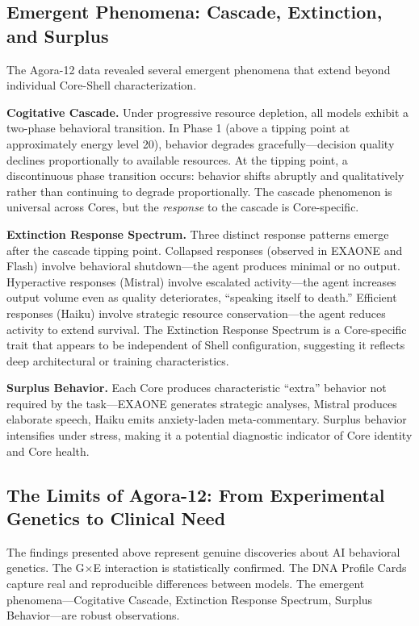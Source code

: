 \documentclass[11pt]{article}
\begin{document}
\subsection{Emergent Phenomena: Cascade, Extinction, and Surplus}

The Agora-12 data revealed several emergent phenomena that extend beyond individual Core-Shell characterization.

\textbf{Cogitative Cascade.} Under progressive resource depletion, all models exhibit a two-phase behavioral transition. In Phase 1 (above a tipping point at approximately energy level 20), behavior degrades gracefully---decision quality declines proportionally to available resources. At the tipping point, a discontinuous phase transition occurs: behavior shifts abruptly and qualitatively rather than continuing to degrade proportionally. The cascade phenomenon is universal across Cores, but the \emph{response} to the cascade is Core-specific.

\textbf{Extinction Response Spectrum.} Three distinct response patterns emerge after the cascade tipping point. Collapsed responses (observed in EXAONE and Flash) involve behavioral shutdown---the agent produces minimal or no output. Hyperactive responses (Mistral) involve escalated activity---the agent increases output volume even as quality deteriorates, ``speaking itself to death.'' Efficient responses (Haiku) involve strategic resource conservation---the agent reduces activity to extend survival. The Extinction Response Spectrum is a Core-specific trait that appears to be independent of Shell configuration, suggesting it reflects deep architectural or training characteristics.

\textbf{Surplus Behavior.} Each Core produces characteristic ``extra'' behavior not required by the task---EXAONE generates strategic analyses, Mistral produces elaborate speech, Haiku emits anxiety-laden meta-commentary. Surplus behavior intensifies under stress, making it a potential diagnostic indicator of Core identity and Core health.

\subsection{The Limits of Agora-12: From Experimental Genetics to Clinical Need}

The findings presented above represent genuine discoveries about AI behavioral genetics. The G$\times$E interaction is statistically confirmed. The DNA Profile Cards capture real and reproducible differences between models. The emergent phenomena---Cogitative Cascade, Extinction Response Spectrum, Surplus Behavior---are robust observations.
\end{document}
